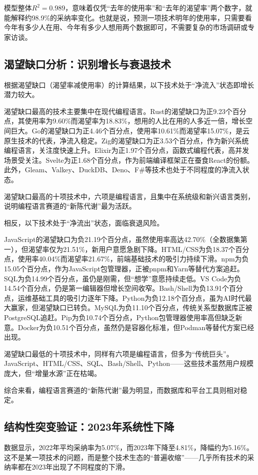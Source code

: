 \documentclass[fontset=windows]{cjc}
\begin{document}
模型整体$R^2 = 0.989$，意味着仅凭“去年的使用率”和“去年的渴望率”两个数字，就能解释约98.9\%的采纳率变化。也就是说，预测一项技术明年的使用率，只需要看今年有多少人在用、今年有多少人想用两个数据即可，不需要复杂的市场调研或专家访谈。

\subsection{渴望缺口分析：识别增长与衰退技术}
根据渴望缺口（渴望率减使用率）的计算结果，以下技术处于“净流入”状态即增长潜力较大。

渴望缺口最高的技术主要集中在现代编程语言。Rust的渴望缺口为正9.23个百分点，其使用率为9.60\%而渴望率为18.83\%，想用的人比在用的人多近一倍，增长空间巨大。Go的渴望缺口为正4.46个百分点，使用率10.61\%而渴望率15.07\%，是云原生技术的代表，净流入稳定。Zig的渴望缺口为正3.53个百分点，作为新兴系统编程语言，关注度快速上升。Elixir为正1.97个百分点，函数式编程代表，高并发场景受关注。Svelte为正1.68个百分点，作为前端编译框架正在蚕食React的份额。此外，Gleam、Valkey、DuckDB、Deno、F\#等技术也处于不同程度的净流入状态。

渴望缺口最高的十项技术中，六项是编程语言，且集中在系统级和新兴语言类别，说明编程语言赛道的“新陈代谢”最为活跃。

相反，以下技术处于“净流出”状态，面临衰退风险。

JavaScript的渴望缺口为负21.19个百分点，虽然使用率高达42.70\%（全数据集第一），但渴望率仅为21.51\%，新用户意愿急剧下降。HTML/CSS为负18.37个百分点，使用率40.04\%而渴望率21.67\%，前端基础技术的吸引力持续下滑。npm为负15.05个百分点，作为JavaScript包管理器，正被pnpm和Yarn等替代方案追赶。SQL为负14.99个百分点，虽仍是刚需，但“想学”意愿持续走低。VS Code为负14.54个百分点，仍是第一编辑器但增长空间收窄。Bash/Shell为负13.91个百分点，运维基础工具的吸引力逐年下降。Python为负12.18个百分点，虽为AI时代最大赢家，但渴望缺口已转负。MySQL为负11.10个百分点，传统关系型数据库正被PostgreSQL追赶。Pip为负10.74个百分点，Python包管理器使用率高但缺乏新意。Docker为负10.51个百分点，虽然仍是容器化标准，但Podman等替代方案已经出现。

渴望缺口最低的十项技术中，同样有六项是编程语言，但多为“传统巨头”。JavaScript、HTML/CSS、SQL、Bash/Shell、Python——这些技术虽然用户规模庞大，但“增量水源”正在枯竭。

综合来看，编程语言赛道的“新陈代谢”最为明显，而数据库和平台工具则相对稳定。

\subsection{结构性突变验证：2023年系统性下降}
数据显示，2022年平均采纳率为5.07\%，而2023年下降至4.81\%，降幅约为5.16\%。这不是某一项技术的问题，而是整个技术生态的“普遍收缩”——几乎所有技术的采纳率都在2023年出现了不同程度的下滑。
\end{document}
